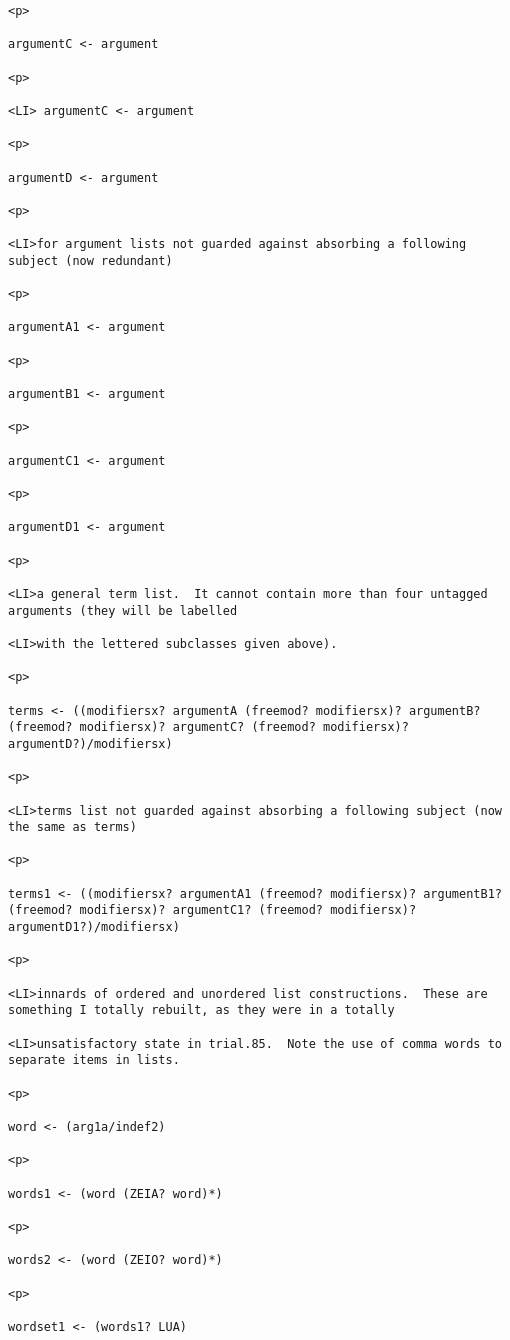 \documentclass[12pt]{article}
\begin{document}
\begin{lstlisting}
<p>

argumentC <- argument

<p>

<LI> argumentC <- argument

<p>

argumentD <- argument

<p>

<LI>for argument lists not guarded against absorbing a following subject (now redundant)

<p>

argumentA1 <- argument

<p>

argumentB1 <- argument

<p>

argumentC1 <- argument

<p>

argumentD1 <- argument

<p>

<LI>a general term list.  It cannot contain more than four untagged arguments (they will be labelled

<LI>with the lettered subclasses given above).

<p>

terms <- ((modifiersx? argumentA (freemod? modifiersx)? argumentB? (freemod? modifiersx)? argumentC? (freemod? modifiersx)? argumentD?)/modifiersx)

<p>

<LI>terms list not guarded against absorbing a following subject (now the same as terms)

<p>

terms1 <- ((modifiersx? argumentA1 (freemod? modifiersx)? argumentB1? (freemod? modifiersx)? argumentC1? (freemod? modifiersx)? argumentD1?)/modifiersx)

<p>

<LI>innards of ordered and unordered list constructions.  These are something I totally rebuilt, as they were in a totally

<LI>unsatisfactory state in trial.85.  Note the use of comma words to separate items in lists.

<p>

word <- (arg1a/indef2)

<p>

words1 <- (word (ZEIA? word)*)

<p>

words2 <- (word (ZEIO? word)*)

<p>

wordset1 <- (words1? LUA)


\end{lstlisting}
\end{document}
